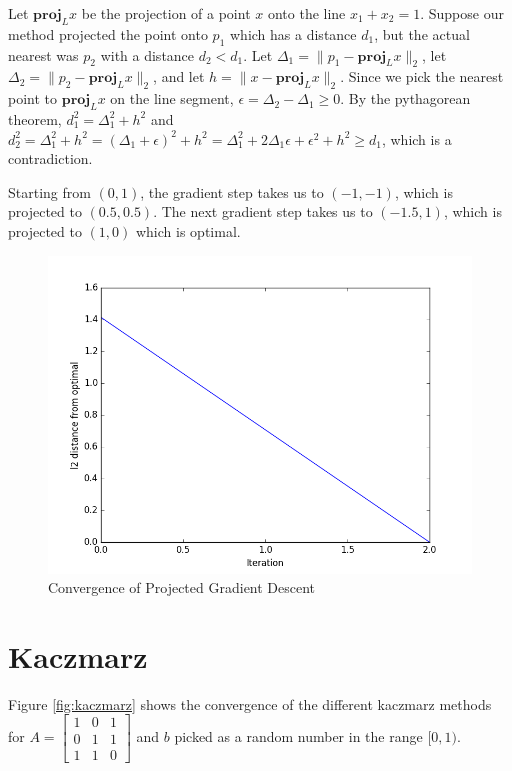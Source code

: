 \documentclass{article}
\newcommand{\proj}[2][]{\textbf{proj}_{#1}#2}
\newcommand\norm[1]{\|#1\|}
\begin{document}
Let $\proj[L]{x}$ be the projection of a point $x$ onto the line $x_1 + x_2 = 1$. Suppose our method projected the point onto $p_1$ which has a distance $d_1$, but the actual nearest was $p_2$ with a distance $d_2 < d_1$. Let $\Delta_1 = \norm{p_1 - \proj[L]{x}}_2$, let $\Delta_2 = \norm{p_2 - \proj[L]{x}}_2$, and let $h = \norm{x - \proj[L]{x}}_2$. Since we pick the nearest point to $\proj[L]{x}$ on the line segment, $\epsilon = \Delta_2 - \Delta_1 \geq 0$. By the pythagorean theorem, $d_1^2 = \Delta_1^2 + h^2$ and $d_2^2 = \Delta_1^2 + h^2 = (\Delta_1 + \epsilon)^2 + h^2 = \Delta_1^2 + 2\Delta_1 \epsilon + \epsilon^2 + h^2 \geq d_1$, which is a contradiction.

Starting from $(0,1)$, the gradient step takes us to $(-1, -1)$, which is projected to $(0.5, 0.5)$. The next gradient step takes us to $(-1.5, 1)$, which is projected to $(1,0)$ which is optimal.

\begin{figure}[!ht]
  \centering
  \includegraphics[width=\textwidth,keepaspectratio=true]{projected-descent.png}
  \caption{Convergence of Projected Gradient Descent}
  \label{fig:projected-descent}
\end{figure}

\section{Kaczmarz}

Figure \ref{fig:kaczmarz} shows the convergence of the different kaczmarz methods for $A = \begin{bmatrix}1 & 0 & 1 \\ 0 & 1 & 1 \\ 1 & 1 & 0\end{bmatrix}$ and $b$ picked as a random number in the range $\lbrack 0, 1)$.
\end{document}

